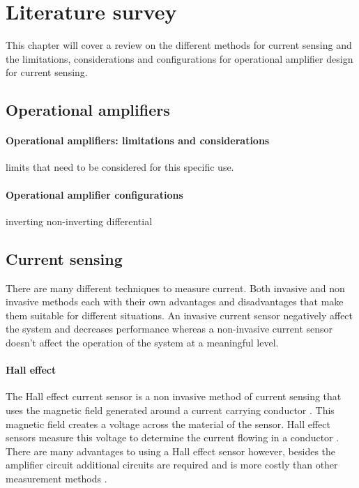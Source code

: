 \chapter{Literature survey}\label{chap:Lit}

This chapter will cover a review on the different methods for current sensing and the limitations, considerations and configurations for operational amplifier design for current sensing. 

\section{Operational amplifiers}\label{sec:opamps}

\subsubsection{Operational amplifiers: limitations and considerations}\label{sec:opamps_limits}
limits that need to be considered for this specific use.
\subsubsection{Operational amplifier configurations}\label{sec:opamps_configs}
inverting
non-inverting
differential

\newpage
\section{Current sensing}\label{sec:cursens}
There are many different techniques to measure current. Both invasive and non invasive methods each with their own advantages and disadvantages that make them suitable for different situations. An invasive current sensor negatively affect the system and decreases performance whereas a non-invasive current sensor doesn't affect the operation of the system at a meaningful level. 

\subsubsection{Hall effect}\label{sec:cursens_hall}
The Hall effect current sensor is a non invasive method of current sensing that uses the magnetic field generated around a current carrying conductor \cite{CircuitDigest}. This magnetic field creates a voltage across the material of the sensor. Hall effect sensors measure this voltage to determine the current flowing in a conductor \cite{Hall}. There are many advantages to using a Hall effect sensor however, besides the amplifier circuit additional circuits are required and is more costly than other measurement methods \cite{CircuitDigest}.

